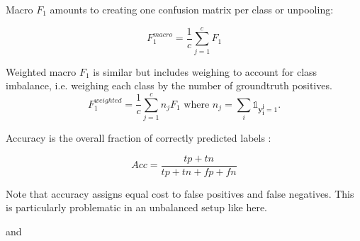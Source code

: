 Macro \(F_1\) \cite{threshForF1} amounts to creating one confusion matrix per class or unpooling:

$$F_1^{macro} = \frac{1}{c} \sum_{j=1}^c F_1$$


Weighted macro \(F_1\)  is similar but includes weighing to account for class imbalance, i.e. weighing each class by the number of groundtruth positives.
\begin{equation}
F_1^{weighted} = \frac{1}{c} \sum_{j=1}^c n_j F_1 \text{ where } n_j = \sum_i \mathds{1}_{\mathbf{y_i^j} = 1}.
\end{equation}


Accuracy is the overall fraction of correctly predicted labels \cite{threshForF1}:

$$
A c c=\frac{t p+t n}{t p+t n+f p+f n}
$$

Note that accuracy assigns equal cost to false positives and false negatives. This is particularly problematic in an unbalanced setup like here.




 \cite{lossComp}

 \cite{MLTSVM} and \cite{MLTSVMThreeway}

